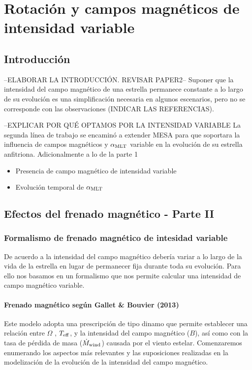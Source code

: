 
\chapter{Rotación y campos magnéticos de intensidad variable}\label{ch:sexto-capitulo}

\section{Introducción}
--ELABORAR LA INTRODUCCIÓN. REVISAR PAPER2--
Suponer que la intensidad del campo magnético de una estrella permanece constante a lo largo de su evolución es una simplificación necesaria en algunos escenarios, pero no se corresponde con las observaciones (INDICAR LAS REFERENCIAS). \par

--EXPLICAR POR QUÉ OPTAMOS POR LA INTENSIDAD VARIABLE
La segunda línea de trabajo se encaminó a extender MESA para que soportara la influencia de campos magnéticos y $\alpha_{\mathrm{MLT}}$ variable en la evolución de su estrella anfitriona.
Adicionalmente a lo de la parte 1
\begin{itemize}
	\item Presencia de campo magnético de intensidad variable
	\item Evolución temporal de $\alpha_{\mathrm{MLT}}$
\end{itemize}
\section{Efectos del frenado magnético - Parte II}

\subsection{Formalismo de frenado magnético de intesidad variable} 
De acuerdo a \cite{Gallet2013} la intensidad del campo magnético debería variar a lo largo de la vida de la estrella en lugar de permanecer fija durante toda su evolución. Para ello nos basamos en un formalismo que nos permite calcular una intensidad de campo magnético variable. 

\subsubsection{Frenado magnético según Gallet \& Bouvier (2013)}
Este modelo adopta una prescripción de tipo dinamo que permite establecer una relación entre $\Omega$ , $T_{\mathrm{eff}}$, y la intensidad del campo magnético ($B$), así como con la tasa de pérdida de masa ($\Dot{M}_{\mathrm{wind}}$) causada por el viento estelar. Comenzaremos enumerando los aspectos más relevantes y las suposiciones realizadas en la modelización de la evolución de la intensidad del campo magnético.\par 


